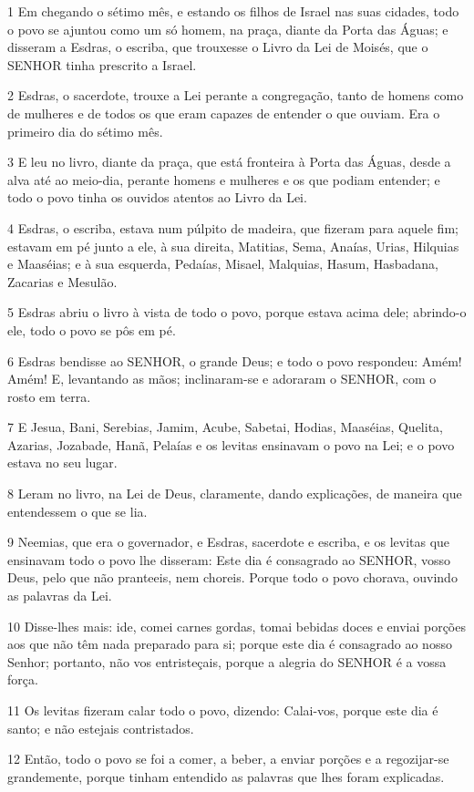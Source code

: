 \par 1 Em chegando o sétimo mês, e estando os filhos de Israel nas suas cidades, todo o povo se ajuntou como um só homem, na praça, diante da Porta das Águas; e disseram a Esdras, o escriba, que trouxesse o Livro da Lei de Moisés, que o SENHOR tinha prescrito a Israel.
\par 2 Esdras, o sacerdote, trouxe a Lei perante a congregação, tanto de homens como de mulheres e de todos os que eram capazes de entender o que ouviam. Era o primeiro dia do sétimo mês.
\par 3 E leu no livro, diante da praça, que está fronteira à Porta das Águas, desde a alva até ao meio-dia, perante homens e mulheres e os que podiam entender; e todo o povo tinha os ouvidos atentos ao Livro da Lei.
\par 4 Esdras, o escriba, estava num púlpito de madeira, que fizeram para aquele fim; estavam em pé junto a ele, à sua direita, Matitias, Sema, Anaías, Urias, Hilquias e Maaséias; e à sua esquerda, Pedaías, Misael, Malquias, Hasum, Hasbadana, Zacarias e Mesulão.
\par 5 Esdras abriu o livro à vista de todo o povo, porque estava acima dele; abrindo-o ele, todo o povo se pôs em pé.
\par 6 Esdras bendisse ao SENHOR, o grande Deus; e todo o povo respondeu: Amém! Amém! E, levantando as mãos; inclinaram-se e adoraram o SENHOR, com o rosto em terra.
\par 7 E Jesua, Bani, Serebias, Jamim, Acube, Sabetai, Hodias, Maaséias, Quelita, Azarias, Jozabade, Hanã, Pelaías e os levitas ensinavam o povo na Lei; e o povo estava no seu lugar.
\par 8 Leram no livro, na Lei de Deus, claramente, dando explicações, de maneira que entendessem o que se lia.
\par 9 Neemias, que era o governador, e Esdras, sacerdote e escriba, e os levitas que ensinavam todo o povo lhe disseram: Este dia é consagrado ao SENHOR, vosso Deus, pelo que não pranteeis, nem choreis. Porque todo o povo chorava, ouvindo as palavras da Lei.
\par 10 Disse-lhes mais: ide, comei carnes gordas, tomai bebidas doces e enviai porções aos que não têm nada preparado para si; porque este dia é consagrado ao nosso Senhor; portanto, não vos entristeçais, porque a alegria do SENHOR é a vossa força.
\par 11 Os levitas fizeram calar todo o povo, dizendo: Calai-vos, porque este dia é santo; e não estejais contristados.
\par 12 Então, todo o povo se foi a comer, a beber, a enviar porções e a regozijar-se grandemente, porque tinham entendido as palavras que lhes foram explicadas.
